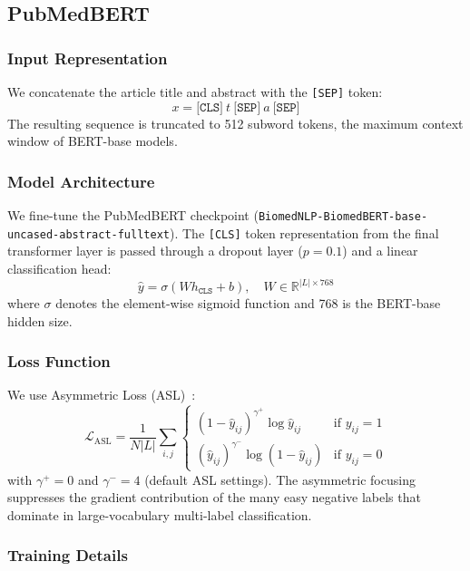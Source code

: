 \documentclass[sigconf]{acmart}
\begin{document}
\subsection{PubMedBERT}

\subsubsection{Input Representation}

We concatenate the article title and abstract with the \texttt{[SEP]} token:
\[
    x = \texttt{[CLS]}\ t\ \texttt{[SEP]}\ a\ \texttt{[SEP]}
\]
The resulting sequence is truncated to 512 subword tokens, the maximum context window of
BERT-base models.

\subsubsection{Model Architecture}

We fine-tune the PubMedBERT checkpoint
(\texttt{BiomedNLP-BiomedBERT-base-uncased-abstract-fulltext}). The \texttt{[CLS]} token representation from the final transformer layer is
passed through a dropout layer ($p = 0.1$) and a linear classification head:
\[
    \hat{y} = \sigma\!\left(W h_{\texttt{CLS}} + b\right), \quad
    W \in \mathbb{R}^{|L| \times 768}
\]
where $\sigma$ denotes the element-wise sigmoid function and 768 is the BERT-base hidden size.

\subsubsection{Loss Function}

We use Asymmetric Loss (ASL)~\cite{ridnik2021asl}:
\[
    \mathcal{L}_{\text{ASL}} = \frac{1}{N|L|} \sum_{i,j}
    \begin{cases}
        (1 - \hat{y}_{ij})^{\gamma^+} \log \hat{y}_{ij} & \text{if } y_{ij} = 1 \\
        (\hat{y}_{ij})^{\gamma^-} \log (1 - \hat{y}_{ij}) & \text{if } y_{ij} = 0
    \end{cases}
\]
with $\gamma^+ = 0$ and $\gamma^- = 4$ (default ASL settings). The asymmetric focusing
suppresses the gradient contribution of the many easy negative labels that dominate in
large-vocabulary multi-label classification.

\subsubsection{Training Details}
\end{document}
